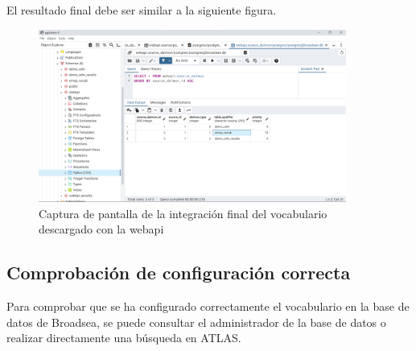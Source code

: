\begin{enumerate}
    El resultado final debe ser similar a la siguiente figura.

    \begin{figure}[H]
        \centering
        \includegraphics[width=0.90\textwidth]{figures/omopVocabResult.png}
        \caption{Captura de pantalla de la integración final del vocabulario descargado con la webapi}
        \label{fig:omopVocabResult}
    \end{figure}

\end{enumerate}

\subsection{Comprobación de configuración correcta}

Para comprobar que se ha configurado correctamente el vocabulario en la base de datos de Broadsea, se puede consultar el administrador de la base de datos o realizar directamente una búsqueda en ATLAS.

